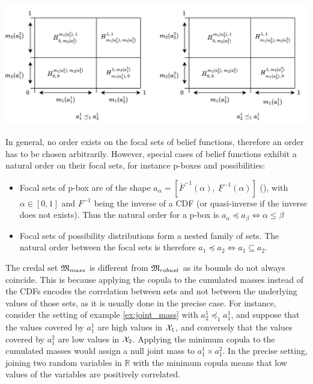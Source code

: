 \begin{example}
    \begin{center}
    \includegraphics[width=\linewidth]{Images/M_mass_h_volume.jpg}\label{fig:joint_distrib_arb}
    \end{center}
\end{example}

In general, no order exists on the focal sets of belief functions, therefore an order has to be chosen arbitrarily. However, special cases of belief functions exhibit a natural order on their focal sets, for instance p-boxes and possibilities:
\begin{itemize}
    \item Focal sets of p-box are of the shape $a_\alpha = [\overline{F}^{-1}(\alpha),~\underline{F}^{-1}(\alpha)]$ (\cite{destercke_unifying_2008}), with $\alpha\in [0,1]$ and $F^{-1}$ being the inverse of a CDF (or quasi-inverse if the inverse does not exists). Thus the natural order for a p-box is $a_\alpha\preceq a_\beta \Leftrightarrow \alpha\leqslant\beta$
    \item Focal sets of possibility distributions form a nested family of sets. The natural order between the focal sets is therefore $a_1\preceq a_2 \Leftrightarrow a_1 \subseteq a_2$.
\end{itemize}

The credal set ${\mathfrak{M}}_{mass}$ is different from ${\mathfrak{M}}_{robust}$ as its bounds do not always coincide. This is because applying the copula to the cumulated masses instead of the CDFs encodes the correlation between sets and not between the underlying values of those sets, as it is usually done in the precise case. For instance, consider the setting of example \ref{ex:joint_mass} with $a_2^1\preceq_1a_1^1$, and suppose that the values covered by $a^1_1$ are high values in ${\mathcal{X}}_1$, and conversely that the values covered by $a^2_1$ are low values in ${\mathcal{X}}_2$. Applying the minimum copula to the cumulated masses would assign a null joint mass to $a_1^1\times a_1^2$. In the precise setting, joining two random variables in $\mathbb{R}$ with the minimum copula means that low values of the variables are positively correlated.

